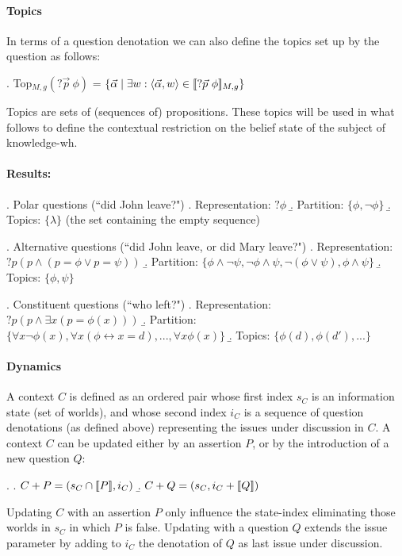 \paragraph{Topics} In terms of a question denotation we can also define the topics set up by the question as follows:

\ex. Top$_{M,g}(?\vec{p} \ \phi)$ = $\{  \vec{\alpha}  \mid \exists w:  
  \langle  \vec{\alpha} , w\rangle  \in \lin ?\vec{p}  \ \phi\rin_{M,g}  \}$

\noindent Topics are sets of (sequences of) propositions. These topics will be used in what follows to define the contextual restriction on the belief state of the subject of   knowledge-wh.
\paragraph{Results:}

\ex. Polar questions (``did John leave?")
\a. Representation: $?\phi$
\b. Partition: $\{\phi, \neg \phi\}$
\b. Topics: $\{ \lambda\}$ (the set containing the empty sequence)


\ex. Alternative questions (``did John leave, or did Mary leave?")
\a. Representation: $?p ( p \wedge (p=\phi \vee p=\psi))$
\b. Partition: $\{\phi \wedge \neg \psi, \neg \phi \wedge   \psi, \neg (\phi\vee \psi), \phi \wedge \psi\}$
\b. Topics: $\{\phi,\psi\}$


\ex. Constituent questions (``who left?")
\a. Representation: $?p( p \wedge \exists x (p=\phi(x)))$
\b. Partition: $\{\forall x  \neg \phi(x), \forall x (\phi \leftrightarrow x=d), ..., \forall x \phi(x)\}$
\b. Topics: $\{\phi(d),\phi(d'), ...\}$


\paragraph{Dynamics}


A context $C$ is defined as an ordered pair whose first index
$s_C$ is an information state (set of worlds), and whose second
index $i_C$ is a sequence of question denotations (as defined above)  representing  the issues  under discussion in $C$. A context $C$ can be updated either by an assertion
$P$, or by the introduction of a new question $Q$:

\ex. \a. $C+P = (s_C \cap \lbrack\!\lbrack P\rbrack\!\rbrack, i_C)$
\b. $C+Q= (s_C, i_C+\lbrack\!\lbrack Q\rbrack\!\rbrack)$

Updating $C$ with an assertion $P$ only influence the state-index    eliminating those worlds in $s_C$ in which $P$ is false.  Updating with a question $Q$ extends the issue parameter by adding to $i_C$ the denotation of $Q$ as last issue under discussion.
 
